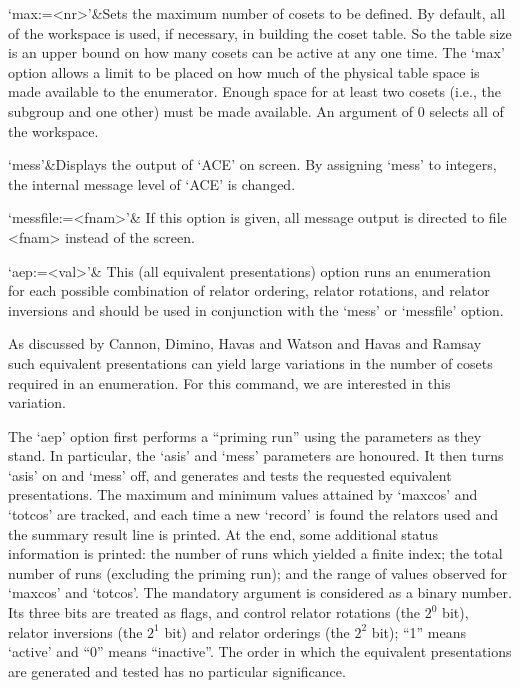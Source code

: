 `max:=<nr>'&Sets the maximum number of cosets to be defined.
By default, all of the workspace is used, if necessary, in building the
coset table.  So the table size is an upper bound on how many cosets can be
active at any one time.  The `max' option allows a limit to be placed on how
much of the physical table space is made available to the enumerator.
Enough space for at least two cosets (i.e., the subgroup and one other) must
be made available.  An argument of 0 selects all of the workspace.
\enditems


\beginitems
`mess'&Displays the output of `ACE' on screen. By assigning `mess' to
integers, the internal message level of `ACE' is changed.

`messfile:=<fnam>'&
If this option is given, all message output is directed to file <fnam>
instead of the screen.

`aep:=<val>'&
This (all equivalent presentations) option runs an enumeration for each
possible combination of relator ordering, relator rotations, and relator
inversions and should be used in conjunction with the `mess' or `messfile'
option.

As discussed by Cannon, Dimino, Havas and Watson \cite{CDHW} and Havas
  and Ramsay \cite{HR1} such equivalent presentations can yield large
  variations in the number of cosets required in an enumeration.
For this command, we are interested in this variation.

The `aep' option first performs a ``priming run'' using the parameters
  as they stand.
In particular, the `asis' and `mess' parameters are honoured.
It then turns `asis' on and `mess' off, and generates and tests
  the requested equivalent presentations.
The maximum and minimum values attained by `maxcos' and `totcos'
  are tracked, and each time a new `record' is found the relators used and
  the summary result line is printed.
At the end, some additional status information is printed: 
  the number of runs which yielded a finite index; 
  the total number of runs (excluding the priming run); 
  and the range of values observed for `maxcos' and `totcos'.
The mandatory argument is considered as a binary number.
Its three bits are treated as flags, and control relator rotations (the
  $2^0$ bit), relator inversions (the $2^1$ bit) and relator orderings
  (the $2^2$ bit); ``1'' means `active' and ``0'' means
  ``inactive''.
The order in which the equivalent presentations are generated and tested
  has no particular significance.

